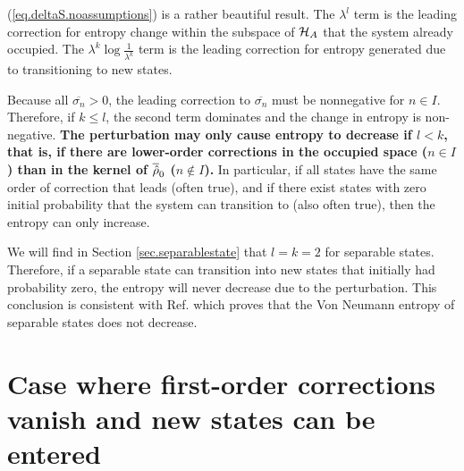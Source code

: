 (\ref{eq.deltaS.noassumptions}) is a rather beautiful result. The \(\lambda^l\) term is the leading correction for entropy change within the subspace of \(\mathcal{H}_A\) that the system already occupied. The \(\lambda^k \log \frac{1}{\lambda^k}\) term is the leading correction for entropy generated due to transitioning to new states.

Because all \(\overline{\sigma_n} > 0\), the leading correction to \(\overline{\sigma_n}\) must be nonnegative for \(n \in I\). Therefore, if \(k \leq l\), the second term dominates and the change in entropy is non-negative. {\bf The perturbation may only cause entropy to decrease if \(l < k\), that is, if there are lower-order corrections in the occupied space (\(n \in I\)) than in the kernel of \(\overline{\hat{\rho}}_0\) (\(n \not\in I\)).} In particular, if all states have the same order of correction that leads (often true), and if there exist states with zero initial probability that the system can transition to (also often true), then the entropy can only increase.

We will find in Section \ref{sec.separablestate} that \(l=k=2\) for separable states. Therefore, if a separable state can transition into new states that initially had probability zero, the entropy will never decrease due to the perturbation. This conclusion is consistent with Ref. \cite{bracken} which proves that the Von Neumann entropy of separable states does not decrease.

\section{Case where first-order corrections vanish and new states can be entered}\label{sec.secoddom}

